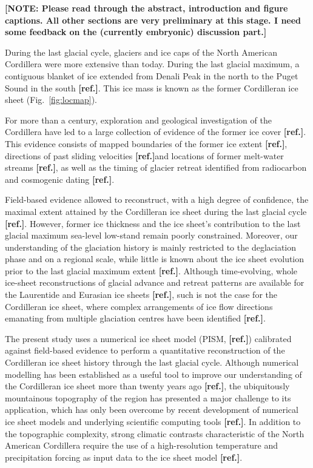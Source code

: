 \documentclass[tc, ms]{copernicus}
\newcommand{\note}[1]{\textbf{[NOTE: #1]}}
\newcommand{\aref}[0]{\textbf{[ref.]}}
\begin{document}
\note{Please read through the abstract, introduction and figure captions. All
      other sections are very preliminary at this stage. I need some feedback
      on the (currently embryonic) discussion part.}

\introduction
\label{sec:intro}

During the last glacial cycle, glaciers and ice caps of the North American
Cordillera were more extensive than today. During the last glacial maximum, a
contiguous blanket of ice extended from Denali Peak in the north to the Puget
Sound in the south \aref. This ice mass is known as the former Cordilleran ice
sheet (Fig.~\ref{fig:locmap}).

For more than a century, exploration and geological investigation of the
Cordillera have led to a large collection of evidence of the former ice cover \aref. This
evidence consists of mapped boundaries of the former ice extent \aref, directions of
past sliding velocities \aref and locations of former melt-water streams \aref, as well as
the timing of glacier retreat identified from radiocarbon and cosmogenic dating \aref.

Field-based evidence allowed to reconstruct, with a high degree of confidence,
the maximal extent attained by the Cordilleran ice sheet during the last glacial
cycle \aref. However, former ice thickness and the ice sheet's contribution to the
last glacial maximum sea-level low-stand remain poorly constrained. Moreover,
our understanding of the glaciation history is mainly restricted to the
deglaciation phase and on a regional scale, while little is known about the ice
sheet evolution prior to the last glacial maximum extent \aref. Although
time-evolving, whole ice-sheet reconstructions of glacial advance and retreat
patterns are available for the Laurentide and Eurasian ice sheets \aref, such is not
the case for the Cordilleran ice sheet, where complex arrangements of ice flow
directions emanating from multiple glaciation centres have been identified \aref.

The present study uses a numerical ice sheet model (PISM, \aref) calibrated against
field-based evidence to perform a quantitative reconstruction of the
Cordilleran ice sheet history through the last glacial cycle. Although
numerical modelling has been established as a useful tool to improve our
understanding
of the Cordilleran ice sheet more than twenty years ago \aref, the ubiquitously
mountainous topography of the region has presented a major challenge to its
application, which has only been overcome by recent development of numerical ice
sheet models and underlying scientific computing tools \aref. In addition to the topographic
complexity, strong climatic contrasts characteristic of the North American
Cordillera require the use of a high-resolution temperature and precipitation
forcing as input data to the ice sheet model \aref.
\end{document}
